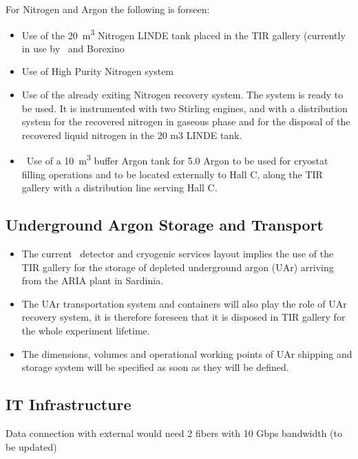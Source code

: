 \vspace{\baselineskip}

For Nitrogen and Argon the following is forseen:
\begin{itemize}
\item Use of the \SI{20}{\cubic\meter} Nitrogen LINDE tank placed in the TIR gallery (currently in use by \DSf\ and Borexino 
\item Use of High Purity Nitrogen system
\item Use of the already exiting Nitrogen recovery system. The system is  ready to be used. It is instrumented with two Stirling engines, and with a distribution system for the recovered nitrogen in gaseous phase and for the disposal of the recovered liquid nitrogen in the 20 m3 LINDE tank.
\item  Use of a \SI{10}{\cubic\meter} buffer Argon tank for 5.0 Argon to be used for cryostat filling operations and to be located externally to Hall C, along the TIR gallery with a distribution line serving Hall C.
\end{itemize}


\subsection{Underground Argon Storage and Transport}
\label{sec:UndegroundArgonStorage}
\begin{itemize}
\item The current \DSks\ detector and cryogenic services layout implies the use of the TIR gallery for the storage of depleted underground argon (UAr) arriving from the ARIA plant in Sardinia.
\item The UAr transportation system and containers will also play the role of UAr recovery system, it is therefore foreseen that it is disposed in TIR gallery for the whole experiment lifetime.
\item The dimensions, volumes and operational working points of UAr shipping and storage system will be specified as soon as they will be defined.
\end{itemize}


\subsection{IT Infrastructure}
\label{sec:ITInfrastructure}

Data connection with external would need 2 fibers with 10 Gbps bandwidth (to be updated)



